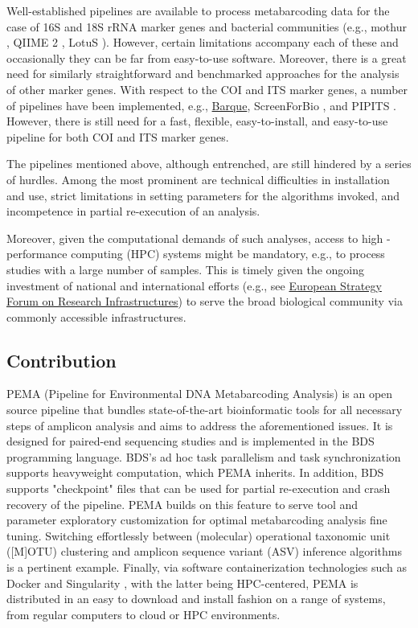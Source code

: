    Well-established pipelines are available to process metabarcoding data for the case of 16S and 18S rRNA marker genes and bacterial communities (e.g., mothur \citep{schloss2009introducing}, QIIME 2 \citep{bolyen2018qiime}, LotuS \citep{hildebrand2014lotus}). 
   However, certain limitations accompany each of these and occasionally they can be far from easy-to-use software. Moreover, there is a great need for similarly straightforward and benchmarked approaches for the analysis of other marker genes. With respect to the COI and ITS marker genes, a number of pipelines have been implemented, e.g., \href{https://github.com/enormandeau/barque}{Barque}, ScreenForBio \citep{axtner2019efficient}, and PIPITS \citep{gweon2015pipits}. 
   However, there is still need for a fast, flexible, easy-to-install, and easy-to-use pipeline for both COI and ITS marker genes.
   
   The pipelines mentioned above, although entrenched, are still hindered by a series of hurdles. 
   Among the most prominent are technical difficulties in installation and use, strict limitations in setting parameters for the algorithms invoked, and incompetence in partial re-execution of an analysis.
   
   Moreover, given the computational demands of such analyses, access to high - performance computing (HPC) systems might be mandatory, e.g., to process studies with a large number of samples. 
   This is timely given the ongoing investment of national and international efforts (e.g., see 
   \href{https://www.esfri.eu/sites/default/files/u4/ESFRI_SCRIPTA_VOL3_INNO_double_page.pdf}{European Strategy Forum on Research Infrastructures}) 
   to serve the broad biological community via commonly accessible infrastructures.
   
   \subsection{Contribution}

   PEMA (Pipeline for Environmental DNA Metabarcoding Analysis) is an open source pipeline that bundles state-of-the-art bioinformatic tools for all necessary steps of amplicon analysis and aims to address the aforementioned issues. 
   It is designed for paired-end sequencing studies and is implemented in the BDS \citep{cingolani2015bigdatascript} programming language. 
   BDS's ad hoc task parallelism and task synchronization supports heavyweight computation, which PEMA inherits. 
   In addition, BDS supports "checkpoint" files that can be used for partial re-execution and crash recovery of the pipeline. 
   PEMA builds on this feature to serve tool and parameter exploratory customization for optimal metabarcoding analysis fine tuning.
   Switching effortlessly between (molecular) operational taxonomic unit ([M]OTU) clustering and amplicon sequence variant (ASV) inference algorithms is a pertinent example. 
   Finally, via software containerization technologies such as Docker \citep{rad2017introduction} and Singularity \citep{kurtzer2017singularity}, with the latter being HPC-centered, PEMA is distributed in an easy to download and install fashion on a range of systems, from regular computers to cloud or HPC environments.
   
